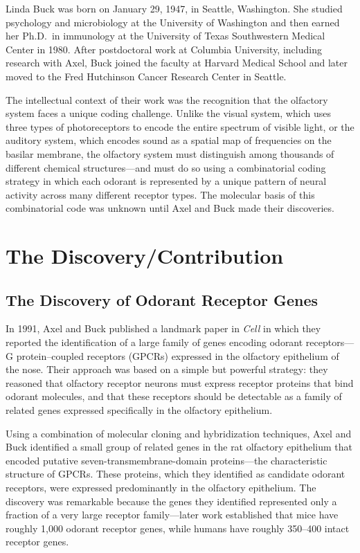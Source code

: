 Linda Buck was born on January 29, 1947, in Seattle, Washington. She studied psychology and microbiology at the University of Washington and then earned her Ph.D.\ in immunology at the University of Texas Southwestern Medical Center in 1980. After postdoctoral work at Columbia University, including research with Axel, Buck joined the faculty at Harvard Medical School and later moved to the Fred Hutchinson Cancer Research Center in Seattle.

The intellectual context of their work was the recognition that the olfactory system faces a unique coding challenge. Unlike the visual system, which uses three types of photoreceptors to encode the entire spectrum of visible light, or the auditory system, which encodes sound as a spatial map of frequencies on the basilar membrane, the olfactory system must distinguish among thousands of different chemical structures---and must do so using a combinatorial coding strategy in which each odorant is represented by a unique pattern of neural activity across many different receptor types. The molecular basis of this combinatorial code was unknown until Axel and Buck made their discoveries.

\section{The Discovery/Contribution}

\subsection{The Discovery of Odorant Receptor Genes}

In 1991, Axel and Buck published a landmark paper in \textit{Cell} in which they reported the identification of a large family of genes encoding odorant receptors---G protein--coupled receptors (GPCRs) expressed in the olfactory epithelium of the nose. Their approach was based on a simple but powerful strategy: they reasoned that olfactory receptor neurons must express receptor proteins that bind odorant molecules, and that these receptors should be detectable as a family of related genes expressed specifically in the olfactory epithelium.

Using a combination of molecular cloning and hybridization techniques, Axel and Buck identified a small group of related genes in the rat olfactory epithelium that encoded putative seven-transmembrane-domain proteins---the characteristic structure of GPCRs. These proteins, which they identified as candidate odorant receptors, were expressed predominantly in the olfactory epithelium. The discovery was remarkable because the genes they identified represented only a fraction of a very large receptor family---later work established that mice have roughly 1,000 odorant receptor genes, while humans have roughly 350--400 intact receptor genes.


